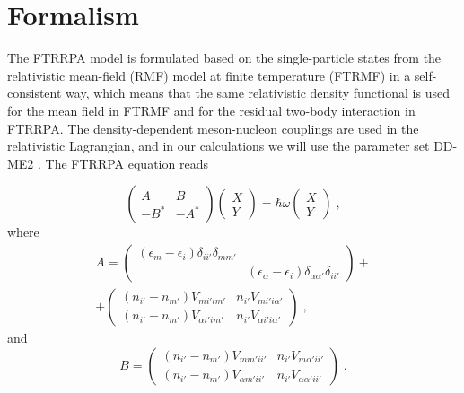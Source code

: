 \documentclass[prc,twocolumn,twoside,showpacs,superscriptaddress,floatfix]{revtex4-1}
\begin{document}
\section{Formalism}\label{formalism}

The FTRRPA model is formulated based on the single-particle states from the
relativistic mean-field (RMF) model at finite temperature (FTRMF) in a
self-consistent way, which means that the same relativistic density functional
is used for the mean field in FTRMF and for the residual two-body interaction
in FTRRPA. The density-dependent meson-nucleon couplings are used in the
relativistic Lagrangian, and in our calculations we will use the parameter set
DD-ME2 \cite{Lala}. The FTRRPA equation reads \cite{Niu_2009}

\begin{equation}
   \left( \begin{array}{cc} A & B \\ -B^* & -A^* \end{array} \right)
   \left( \begin{array}{c} X \\ Y \end{array} \right)
   = \hbar\omega \left( \begin{array}{c} X \\ Y \end{array} \right) \;,
\end{equation}
where
\begin{multline}
   A = \left( \begin{array}{cc} (\epsilon_m - \epsilon_i)
   \delta_{ii'} \delta_{mm'} &  \\
   & (\epsilon_\alpha - \epsilon_i) \delta_{\alpha \alpha'}
   \delta_{ii'} \end{array} \right) + \\
   + \left( \begin{array}{cc} (n_{i'} - n_{m'})V_{mi'im'} & n_{i'} V_{mi'i\alpha'} \\
   (n_{i'} - n_{m'})V_{\alpha i' i m'}  &n_{i'} V_{\alpha i' i \alpha'} \end{array}
   \right) \;,
  \end{multline}
  and
\begin{equation}
   B =\left( \begin{array}{cc} (n_{i'} - n_{m'})V_{mm'ii'} & n_{i'}V_{m\alpha'ii'} \\
    (n_{i'} - n_{m'})V_{\alpha m' i i'}  & n_{i'}  V_{\alpha \alpha' i i' } \end{array}
    \right)\; .
  \end{equation}
\end{document}
